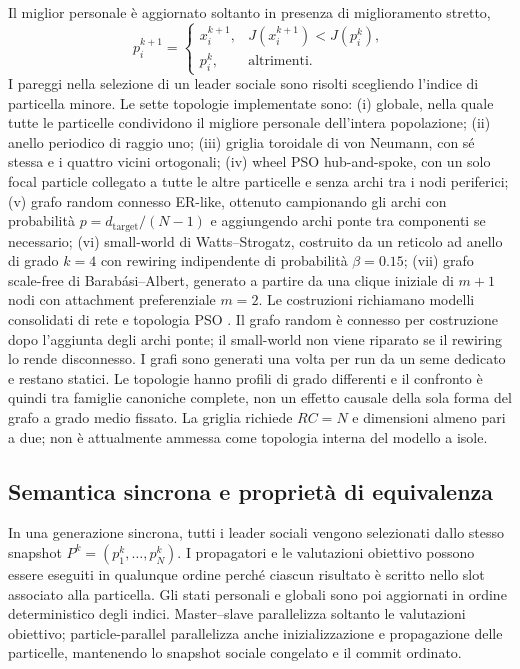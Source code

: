 Il miglior personale è aggiornato soltanto in presenza di miglioramento stretto,
\begin{equation}
  p_i^{k+1}=\begin{cases}
    x_i^{k+1},&J(x_i^{k+1})<J(p_i^k),\\
    p_i^k,&\text{altrimenti}.
  \end{cases}
  \label{eq:personal-best}
\end{equation}
I pareggi nella selezione di un leader sociale sono risolti scegliendo l'indice di particella minore. Le sette topologie implementate sono: (i) globale, nella quale tutte le particelle condividono il migliore personale dell'intera popolazione; (ii) anello periodico di raggio uno; (iii) griglia toroidale di von Neumann, con sé stessa e i quattro vicini ortogonali; (iv) wheel PSO hub-and-spoke, con un solo focal particle collegato a tutte le altre particelle e senza archi tra i nodi periferici; (v) grafo random connesso ER-like, ottenuto campionando gli archi con probabilità $p=d_{\mathrm{target}}/(N-1)$ e aggiungendo archi ponte tra componenti se necessario; (vi) small-world di Watts--Strogatz, costruito da un reticolo ad anello di grado $k=4$ con rewiring indipendente di probabilità $\beta=0.15$; (vii) grafo scale-free di Barab\'asi--Albert, generato a partire da una clique iniziale di $m+1$ nodi con attachment preferenziale $m=2$. Le costruzioni richiamano modelli consolidati di rete e topologia PSO \citep{Kennedy1999Topology,ErdosRenyi1959,WattsStrogatz1998,BarabasiAlbert1999,LiuScaleFreePSO2014}. Il grafo random è connesso per costruzione dopo l'aggiunta degli archi ponte; il small-world non viene riparato se il rewiring lo rende disconnesso. I grafi sono generati una volta per run da un seme dedicato e restano statici. Le topologie hanno profili di grado differenti e il confronto è quindi tra famiglie canoniche complete, non un effetto causale della sola forma del grafo a grado medio fissato. La griglia richiede $RC=N$ e dimensioni almeno pari a due; non è attualmente ammessa come topologia interna del modello a isole.

\subsection{Semantica sincrona e proprietà di equivalenza}

In una generazione sincrona, tutti i leader sociali vengono selezionati dallo stesso snapshot $P^k=(p_1^k,\ldots,p_N^k)$. I propagatori e le valutazioni obiettivo possono essere eseguiti in qualunque ordine perché ciascun risultato è scritto nello slot associato alla particella. Gli stati personali e globali sono poi aggiornati in ordine deterministico degli indici. Master--slave parallelizza soltanto le valutazioni obiettivo; particle-parallel parallelizza anche inizializzazione e propagazione delle particelle, mantenendo lo snapshot sociale congelato e il commit ordinato.

